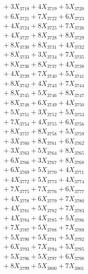 \documentclass[a4paper,10pt]{article}
\begin{document}
{\begin{align}
&\;  + 3 X_{3718} + 4 X_{3719} + 5 X_{3720} \\[0.3ex]
&\;  + 6 X_{3721} + 7 X_{3722} + 6 X_{3723} \\[0.3ex]
&\;  + 4 X_{3724} + 8 X_{3725} + 7 X_{3726} \\[0.3ex]
&\;  + 4 X_{3727} + 8 X_{3728} + 8 X_{3729} \\[0.5ex]\allowbreak
&\;  + 8 X_{3730} + 8 X_{3731} + 4 X_{3732} \\[0.3ex]
&\;  + 8 X_{3733} + 3 X_{3734} + 7 X_{3735} \\[0.3ex]
&\;  + 8 X_{3736} + 8 X_{3737} + 4 X_{3738} \\[0.3ex]
&\;  + 4 X_{3739} + 7 X_{3740} + 5 X_{3741} \\[0.3ex]
&\;  + 8 X_{3742} + 4 X_{3743} + 7 X_{3744} \\[0.3ex]
&\;  + 8 X_{3745} + 5 X_{3746} + 8 X_{3747} \\[0.3ex]
&\;  + 8 X_{3748} + 6 X_{3749} + 4 X_{3750} \\[0.3ex]
&\;  + 5 X_{3751} + 3 X_{3752} + 5 X_{3753} \\[0.3ex]
&\;  + 7 X_{3754} + 4 X_{3755} + 6 X_{3756} \\[0.3ex]
&\;  + 8 X_{3757} + 8 X_{3758} + 5 X_{3759} \\[0.5ex]\allowbreak
&\;  + 3 X_{3760} + 8 X_{3761} + 6 X_{3762} \\[0.3ex]
&\;  + 3 X_{3763} + 5 X_{3764} + 8 X_{3765} \\[0.3ex]
&\;  + 6 X_{3766} + 3 X_{3767} + 8 X_{3768} \\[0.3ex]
&\;  + 6 X_{3769} + 5 X_{3770} + 4 X_{3771} \\[0.3ex]
&\;  + 4 X_{3772} + 5 X_{3773} + 4 X_{3774} \\[0.3ex]
&\;  + 7 X_{3775} + 7 X_{3776} + 6 X_{3777} \\[0.3ex]
&\;  + 4 X_{3778} + 6 X_{3779} + 7 X_{3780} \\[0.3ex]
&\;  + 4 X_{3781} + 5 X_{3782} + 7 X_{3783} \\[0.3ex]
&\;  + 4 X_{3784} + 4 X_{3785} + 5 X_{3786} \\[0.3ex]
&\;  + 7 X_{3787} + 5 X_{3788} + 7 X_{3789} \\[0.5ex]\allowbreak
&\;  + 5 X_{3790} + 5 X_{3791} + 5 X_{3792} \\[0.3ex]
&\;  + 6 X_{3793} + 7 X_{3794} + 5 X_{3795} \\[0.3ex]
&\;  + 5 X_{3796} + 5 X_{3797} + 6 X_{3798} \\[0.3ex]
&\;  + 8 X_{3799} + 5 X_{3800} + 7 X_{3801} \\[0.3ex]

\end{align}}
\end{document}
